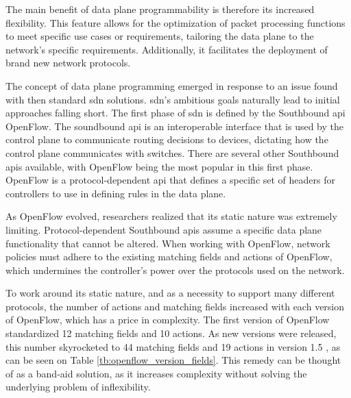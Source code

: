 The main benefit of data plane programmability is therefore its increased flexibility\cite{bifulco_survey_2018}. This feature allows for the optimization of packet processing functions to meet specific use cases or requirements, tailoring the data plane to the network's specific requirements. Additionally, it facilitates the deployment of brand new network protocols. 

The concept of data plane programming emerged in response to an issue found with then standard \gls{sdn} solutions. \gls{sdn}'s ambitious goals naturally lead to initial approaches falling short. The first phase of \gls{sdn} is defined by the Southbound \gls{api} OpenFlow. The soundbound \gls{api} is an interoperable interface that is used by the control plane to communicate routing decisions to devices, dictating how the control plane communicates with switches\cite{li_protocol_2017}. There are several other Southbound \glspl{api} available, with OpenFlow being the most popular in this first phase. OpenFlow is a protocol-dependent \gls{api} that defines a specific set of headers for controllers to use in defining rules in the data plane. 

As OpenFlow evolved, researchers realized that its static nature was extremely limiting\cite{bosshart_p4_2014}\cite{hauser_survey_2021}\cite{li_protocol_2017}. Protocol-dependent Southbound \glspl{api} assume a specific data plane functionality that cannot be altered. When working with OpenFlow, network policies must adhere to the existing matching fields and actions of OpenFlow, which undermines the controller's power over the protocols used on the network.  

To work around its static nature, and as a necessity to support many different protocols, the number of actions and matching fields increased with each version of OpenFlow, which has a price in complexity. The first version of OpenFlow standardized 12 matching fields and 10 actions. As new versions were released, this number skyrocketed to 44 matching fields and 19 actions in version 1.5 \cite{li_protocol_2017}\cite{bosshart_p4_2014}, as can be seen on Table \ref{tb:openflow_version_fields}. This remedy can be thought of as a band-aid solution, as it increases complexity without solving the underlying problem of inflexibility.


